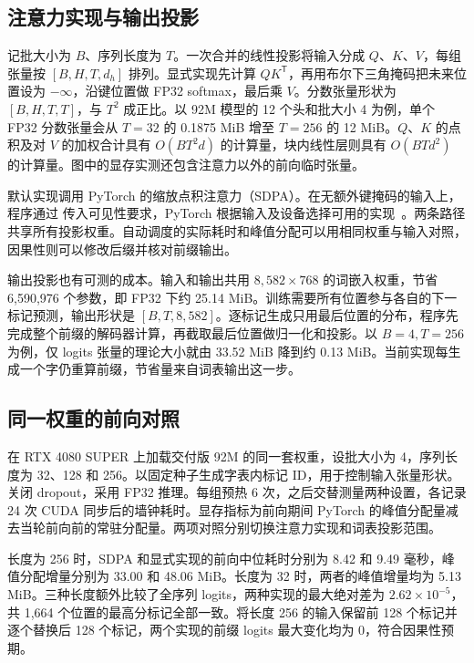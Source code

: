 \subsection{注意力实现与输出投影}

记批大小为 $B$、序列长度为 $T$。一次合并的线性投影将输入分成 $Q$、$K$、$V$，每组张量按 $[B,H,T,d_h]$ 排列。显式实现先计算 $QK^{\mathsf T}$，再用布尔下三角掩码把未来位置设为 $-\infty$，沿键位置做 FP32 softmax，最后乘 $V$。分数张量形状为 $[B,H,T,T]$，与 $T^2$ 成正比。以 92M 模型的 12 个头和批大小 4 为例，单个 FP32 分数张量会从 $T=32$ 的 0.1875 MiB 增至 $T=256$ 的 12 MiB。$Q$、$K$ 的点积及对 $V$ 的加权合计具有 $O(BT^2d)$ 的计算量，块内线性层则具有 $O(BTd^2)$ 的计算量。图中的显存实测还包含注意力以外的前向临时张量。

默认实现调用 PyTorch 的缩放点积注意力（SDPA）。在无额外键掩码的输入上，程序通过  传入可见性要求，PyTorch 根据输入及设备选择可用的实现~\cite{pytorch214sdpa}。两条路径共享所有投影权重。自动调度的实际耗时和峰值分配可以用相同权重与输入对照，因果性则可以修改后缀并核对前缀输出。

输出投影也有可测的成本。输入和输出共用 $8{,}582\times768$ 的词嵌入权重，节省 6,590,976 个参数，即 FP32 下约 25.14 MiB。训练需要所有位置参与各自的下一标记预测，输出形状是 $[B,T,8{,}582]$。逐标记生成只用最后位置的分布，程序先完成整个前缀的解码器计算，再截取最后位置做归一化和投影。以 $B=4,T=256$ 为例，仅 logits 张量的理论大小就由 33.52 MiB 降到约 0.13 MiB。当前实现每生成一个字仍重算前缀，节省量来自词表输出这一步。

\subsection{同一权重的前向对照}

在 RTX 4080 SUPER 上加载交付版 92M 的同一套权重，设批大小为 4，序列长度为 32、128 和 256。以固定种子生成字表内标记 ID，用于控制输入张量形状。关闭 dropout，采用 FP32 推理。每组预热 6 次，之后交替测量两种设置，各记录 24 次 CUDA 同步后的墙钟耗时。显存指标为前向期间 PyTorch 的峰值分配量减去当轮前向前的常驻分配量。两项对照分别切换注意力实现和词表投影范围。


长度为 256 时，SDPA 和显式实现的前向中位耗时分别为 8.42 和 9.49 毫秒，峰值分配增量分别为 33.00 和 48.06 MiB。长度为 32 时，两者的峰值增量均为 5.13 MiB。三种长度额外比较了全序列 logits，两种实现的最大绝对差为 $2.62\times10^{-5}$，共 1,664 个位置的最高分标记全部一致。将长度 256 的输入保留前 128 个标记并逐个替换后 128 个标记，两个实现的前缀 logits 最大变化均为 0，符合因果性预期。

